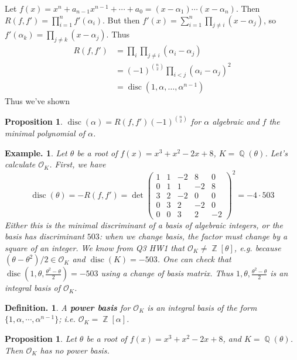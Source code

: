 \documentclass[11pt, a4paper]{memoir}
\DeclareMathOperator{\Q}{{\mathbb{Q}}}
\DeclareMathOperator{\Z}{{\mathbb{Z}}}
\theoremstyle{change}
\newtheorem{proposition}[theorem]{Proposition}
\theoremstyle{plain}
\theoremstyle{nonumberplain}
\newtheorem{definition}{Definition.}
\newtheorem{example}{Example.}
\DeclareMathOperator{\disc}{disc}
\begin{document}
Let $f(x)=x^n+a_{n-1}x^{n-1}+\cdots+a_0=(x-\alpha_1)\cdots(x-\alpha_n)$.
Then $R(f,f')=\prod_{i=1}^n f'(\alpha_i)$.
But then $f'(x)=\sum_{i=1}^n\prod_{j\neq i}(x-\alpha_j)$, so $f'(\alpha_k)=\prod_{j\neq k}(x-\alpha_j)$.
Thus
\begin{align*}
    R(f,f') &= \prod_{i}\prod_{j\neq i}(\alpha_i-\alpha_j)\\
            &= (-1)^{\binom{n}{2}}\prod_{i<j}(\alpha_i-\alpha_j)^2\\
            &= \disc(1,\alpha,\ldots,\alpha^{n-1})
\end{align*}
Thus we've shown
\begin{proposition}
    $\disc(\alpha)=R(f,f')(-1)^{\binom{n}{2}}$ for $\alpha$ algebraic and $f$ the minimal polynomial of $\alpha$.
\end{proposition}
\begin{example}
    Let $\theta$ be a root of $f(x)=x^3+x^2-2x+8$, $K=\Q(\theta)$.
    Let's calculate $\mathcal{O}_K$.
    First, we have
    \begin{equation*}
        \disc(\theta)=-R(f,f')=
        \det
        \begin{pmatrix}
            1&1&-2&8&0\\
            0&1&1&-2&8\\
            3&2&-2&0&0\\
            0&3&2&-2&0\\
            0&0&3&2&-2
        \end{pmatrix}^2
        =-4\cdot 503
    \end{equation*}
    Either this is the minimal discriminant of a basis of algebraic integers, or the basis has discriminant $503$: when we change basis, the factor must change by a square of an integer.
    We know from Q3 HW1 that $\mathcal{O}_K\neq\Z[\theta]$, e.g. because $(\theta-\theta^2)/2\in\mathcal{O}_K$ and $\disc(K)=-503$.
    One can check that $\disc(1,\theta,\frac{\theta^2-\theta}{2})=-503$ using a change of basis matrix.
    Thus $1,\theta,\frac{\theta^2-\theta}{2}$ is an integral basis of $\mathcal{O}_K$.
\end{example}
\begin{definition}
    A \textbf{power basis} for $\mathcal{O}_K$ is an integral basis of the form $\{1,\alpha,\cdots,\alpha^{n-1}\}$; i.e. $\mathcal{O}_K=\Z[\alpha]$.
\end{definition}
\begin{proposition}
    Let $\theta$ be a root of $f(x)=x^3+x^2-2x+8$, and $K=\Q(\theta)$.
    Then $\mathcal{O}_K$ has no power basis.
\end{proposition}
\end{document}
